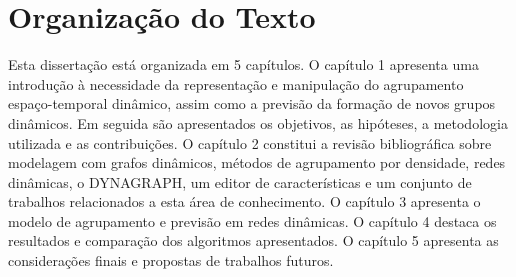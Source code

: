 \section{Organização do Texto}
Esta dissertação está organizada em 5 capítulos. O capítulo 1 apresenta uma
introdução à necessidade da representação e manipulação do agrupamento espaço-temporal
dinâmico, assim como a previsão da formação de novos grupos dinâmicos. Em seguida são apresentados os objetivos,
as hipóteses, a metodologia utilizada e as contribuições. O capítulo 2 constitui a revisão
bibliográfica sobre modelagem com grafos dinâmicos, métodos de agrupamento por densidade, redes dinâmicas,
o DYNAGRAPH, um editor de características e um conjunto de trabalhos relacionados a esta área de conhecimento.
O capítulo 3 apresenta o modelo de agrupamento e previsão em redes dinâmicas. O capítulo 4 destaca
os resultados e comparação dos algoritmos apresentados. O capítulo 5 apresenta as considerações finais
e propostas de trabalhos futuros.








